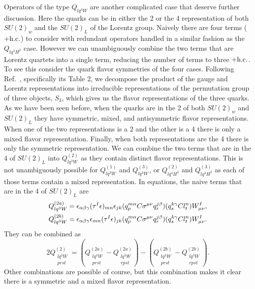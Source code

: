 \begin{enumerate}
Operators of the type $Q_{lq^3W}$ are another complicated case that deserve further discussion.
Here the quarks can be in either the 2 or the 4 representation of both $SU(2)_w$ and the $SU(2)_L$ of the Lorentz group.
Naively there are four terms ($+ \mathrm{h.c.}$) to consider with redundant operators handled in a similar fashion as the $Q_{lq^3H^2}$ case.
However we can unambiguously combine the two terms that are Lorentz quartets into a single term, reducing the number of terms to three $+ \mathrm{h.c.}$.
To see this consider the quark flavor symmetries of the four cases.
Following Ref.~\cite{Fonseca:2019yya}, specifically its Table 2, we decompose the product of the gauge and Lorentz representations into irreducible representations of the permutation group of three objects, $S_3$, which gives us the flavor representations of the three quarks.
As we have been seen before, when the quarks are in the 2 of both $SU(2)_w$ and $SU(2)_L$ they have symmetric, mixed, and antisymmetric flavor representations.
When one of the two representations is a 2 and the other is a 4 there is only a mixed flavor representation.
Finally, when both representations are the 4 there is only the symmetric representation.
We can combine the two terms that are in the 4 of $SU(2)_L$ into $Q_{lq^3W}^{(2)}$ as they contain distinct flavor representations.
This is not unambiguously possible for $Q_{lq^3W}^{(1)}$ and $Q_{lq^3W}^{(3)}$, or $Q_{lq^3H^2}^{(2)}$ and $Q_{lq^3H^2}^{(3)}$ as each of those terms contain a mixed representation.
In equations, the naive terms that are in the 4 of $SU(2)_L$ are
\begin{align}
Q_{lq^3W}^{(2a)} &= \epsilon_{\alpha\beta\gamma} (\tau^I \epsilon)_{mn} \epsilon_{jk} (q_p^{m\alpha} C  \sigma^{\mu\nu}q_r^{j\beta}) (q_s^{k\gamma} C l_t^n) W^I_{\mu\nu} ,\nn
%
Q_{lq^3W}^{(2b)} &= \epsilon_{\alpha\beta\gamma} \epsilon_{mn} (\tau^I \epsilon)_{jk} (q_p^{m\alpha} C \sigma^{\mu\nu}q_r^{j\beta}) (q_s^{k\gamma} C  l_t^n) W^I_{\mu\nu} .
\end{align}
They can be combined as 
\begin{equation}
2 Q_{\substack{lq^3W \\ prst}}^{(2)} = (Q_{\substack{lq^3W \\ prst}}^{(2a)} - Q_{\substack{lq^3W \\ rpst}}^{(2a)}) - (Q_{\substack{lq^3W \\ prst}}^{(2b)} - Q_{\substack{lq^3W \\ rpst}}^{(2b)}) .
\end{equation}
Other combinations are possible of course, but this combination makes it clear there is a symmetric and a mixed flavor representation.


\end{enumerate}
